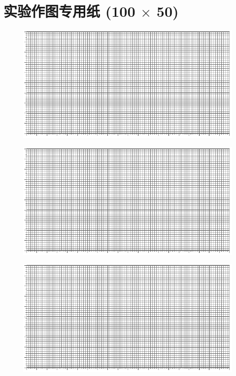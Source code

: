 \documentclass[UTF8]{article}
\begin{document}

\newpage
\section*{实验作图专用纸 (100 $\times$ 50)}

\begin{figure}[H]\centering
\includegraphics[width=\columnwidth]{assets/100x50.pdf}
\end{figure}
\begin{figure}[H]\centering
\includegraphics[width=\columnwidth]{assets/100x50.pdf}
\end{figure}

\begin{figure}[H]\centering
\includegraphics[width=0.8\columnwidth]{assets/100x50.pdf}
\end{figure}
\end{document}
